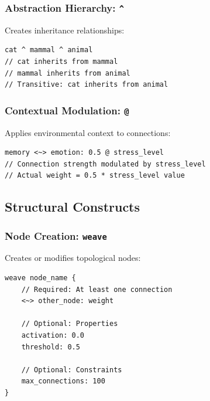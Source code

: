 \documentclass[12pt,a4paper,openany]{book} %
\begin{document}
\subsubsection{Abstraction Hierarchy: \texttt{\^{}}}

Creates inheritance relationships:

\vspace{0.5em}
\begin{lstlisting}[language=loom]
cat ^ mammal ^ animal
// cat inherits from mammal
// mammal inherits from animal
// Transitive: cat inherits from animal
\end{lstlisting}
\vspace{0.5em}

\subsubsection{Contextual Modulation: \texttt{@}}

Applies environmental context to connections:

\vspace{0.5em}
\begin{lstlisting}[language=loom]
memory <~> emotion: 0.5 @ stress_level
// Connection strength modulated by stress_level
// Actual weight = 0.5 * stress_level value
\end{lstlisting}
\vspace{0.5em}

\subsection{Structural Constructs}

\subsubsection{Node Creation: \texttt{weave}}

Creates or modifies topological nodes:

\vspace{0.5em}
\begin{lstlisting}[language=loom]
weave node_name {
    // Required: At least one connection
    <~> other_node: weight

    // Optional: Properties
    activation: 0.0
    threshold: 0.5

    // Optional: Constraints
    max_connections: 100
}
\end{lstlisting}
\vspace{0.5em}
\end{document}
